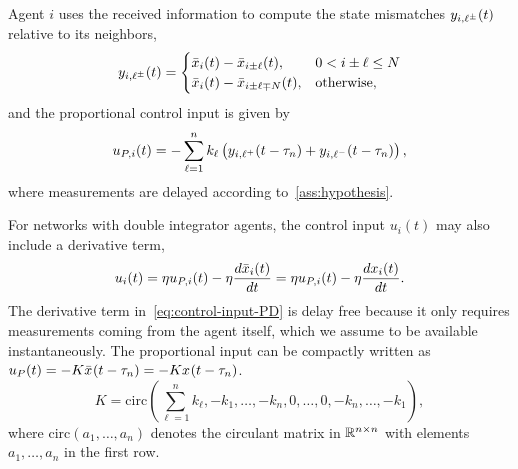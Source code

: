
Agent $ i $ uses the received information to compute the
state mismatches $ y_{i,\ell^\pm}(t) $ {relative to its} neighbors,
\begin{equation}\label{eq:meas}
	y_{i,\ell^\pm}(t) = 
	\begin{cases}
		\bar{x}_{i}(t) - \bar{x}_{i\pm\ell}(t), & 0<i\pm\ell\le N\\
		\bar{x}_{i}(t) - \bar{x}_{i\pm\ell\mp N}(t), & \mbox{otherwise},
	\end{cases}
\end{equation}
{and} the proportional control input is {given by}
\begin{equation}\label{eq:prop-control}
	u_{P,i}(t) = -\sum_{\ell=1}^{n}k_\ell\left(y_{i,\ell^+}(t-\tau_n)+y_{i,\ell^-}(t-\tau_n)\right),
\end{equation}
where measurements are delayed according to~\cref{ass:hypothesis}.

For networks with double integrator agents,
the control input $u_i(t)$ may also include a derivative term,
\begin{equation}\label{eq:control-input-PD}
	u_{i}(t) = \eta u_{P,i}(t) - \eta\dfrac{d\bar{x}_{i}(t)}{dt} = \eta u_{P,i}(t) -\eta\dfrac{dx_{i}(t)}{dt}.
\end{equation}
The derivative term in~\eqref{eq:control-input-PD} is delay free
because it only requires measurements coming from the agent itself,
which we assume {to be} available instantaneously. 
The proportional input can be compactly written as $ u_{P}(t) = -K\bar{x}_{}(t-\tau_n)=-Kx_{}(t-\tau_n) $.
\begin{equation}\label{eq:feedback-matrix}
		K = \mathrm{circ}
		\left(\sum_{\ell=1}^nk_\ell, -k_1, \dots, -k_n, 0,  \dots, 0, -k_n, \dots, -k_1\right),
\end{equation}
where $ \mathrm{circ}\left(a_1,\dots,a_n\right) $ denotes the circulant matrix in $ { {\mathbb R}^{n\times n} } $
with elements $ a_1,\dots,a_n $ in the first row.

